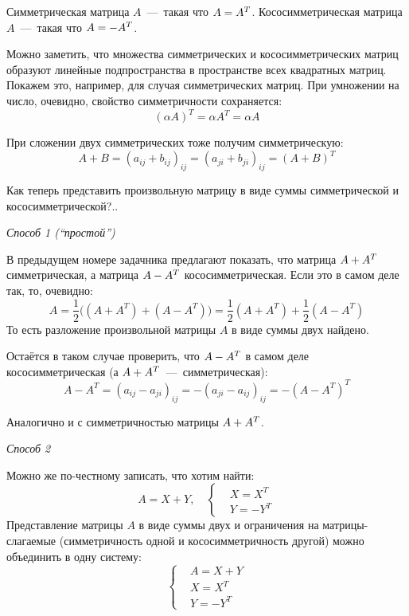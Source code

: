 \documentclass[a4paper,12pt]{article}
\begin{document}
  \begin{solution}
    Симметрическая матрица $A$~---~такая что $A \hm= A^T$.
    Кососимметрическая матрица $A$~---~такая что $A \hm= -A^T$.
    
    Можно заметить, что множества симметрических и кососимметрических матриц образуют линейные подпространства в пространстве всех квадратных матриц.
    Покажем это, например, для случая симметрических матриц.
    При умножении на число, очевидно, свойство симметричности сохраняется:
    \[
      (\alpha A)^T = \alpha A^T = \alpha A
    \]
    
    При сложении двух симметрических тоже получим симметрическую:
    \[
      A + B = (a_{ij} + b_{ij})_{ij} = (a_{ji} + b_{ji})_{ij} = (A + B)^T
    \]
    
    Как теперь представить произвольную матрицу в виде суммы симметрической и кососимметрической?..
    
    \bigskip
    
    \emph{Способ 1 (``простой'')}
    
    В предыдущем номере задачника предлагают показать, что матрица $A \hm+ A^T$ симметрическая, а матрица $A \hm- A^T$ кососимметрическая.
    Если это в самом деле так, то, очевидно:
    \[
      A = \frac{1}{2} \bigl((A + A^T) + (A - A^T)\bigr) = \frac{1}{2} (A + A^T) + \frac{1}{2} (A - A^T)
    \]
    То есть разложение произвольной матрицы $A$ в виде суммы двух найдено.
    
    Остаётся в таком случае проверить, что $A \hm- A^T$ в самом деле кососимметрическая (а $A \hm+ A^T$~---~симметрическая):
    \[
      A - A^T = (a_{ij} - a_{ji})_{ij} = -(a_{ji} - a_{ij})_{ij} = -(A - A^T)^T
    \]
    
    Аналогично и с симметричностью матрицы $A \hm+ A^T$.
    
    \bigskip
    
    \emph{Способ 2}
    
    Можно же по-честному записать, что хотим найти:
    \[
      A = X + Y,\quad
      \left\{
        \begin{aligned}
          &X = X^T\\
          &Y = -Y^T
        \end{aligned}
      \right.
    \]
    Представление матрицы $A$ в виде суммы двух и ограничения на матрицы-слагаемые (симметричность одной и кососимметричность другой) можно объединить в одну систему:
    \[
      \left\{
        \begin{aligned}
          &A = X + Y\\
          &X = X^T\\
          &Y = -Y^T
        \end{aligned}
      \right.
    \]
    

\end{solution}
\end{document}
